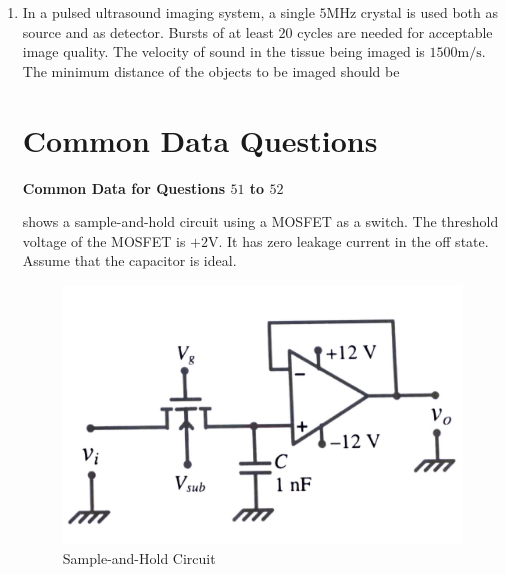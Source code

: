 \documentclass[journal,12pt,onecolumn]{IEEEtran}
\theoremstyle{remark}
\begin{document}
\begin{enumerate}
\item In a pulsed ultrasound imaging system, a single $5\text{MHz}$ crystal is used both as source and as detector. Bursts of at least $20$ cycles are needed for acceptable image quality. The velocity of sound in the tissue being imaged is $1500\text{m/s}$. The minimum distance of the objects to be imaged should be \par \hfill{}
\begin{enumerate}
\end{enumerate}


\section*{\textbf{Common Data Questions}}


\textbf{Common Data for Questions $51$ to $52$}\par

 shows a sample-and-hold circuit using a MOSFET as a switch. The threshold voltage of the MOSFET is $+2\text{V}$. It has zero leakage current in the off state. Assume that the capacitor is ideal.

\begin{figure}[H]
    \centering
    \includegraphics[width=0.5\columnwidth]{Figs/Q-51,52.jpg}
    \caption{Sample-and-Hold Circuit}
    \label{fig:placeholder_15}
\end{figure}

 


\end{enumerate}
\end{document}
